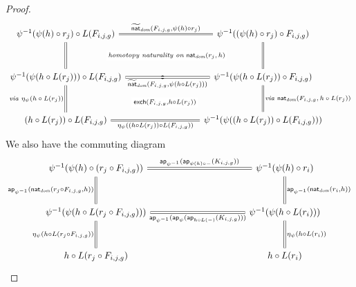 \documentclass[10pt,a4paper]{article}
\theoremstyle{definition}
\theoremstyle{remark}
\newcommand{\dom}{\textit{dom}}
\newcommand{\nat}{\mathsf{nat}}
\newcommand{\0}{\mathbf{0}}
\newcommand{\1}{\mathbf{1}}
\newcommand{\2}{\mathbf{2}}
\DeclareMathOperator{\ap}{\mathsf{ap}}
\begin{document}
\begin{proof}
\[ 
\begin{tikzcd}[column sep = 35, row sep = 30]
	{\psi^{-1}(\psi(h) \circ r_j) \circ L(F_{i,j,g})} && {\psi^{-1}(\mleft(\psi(h) \circ r_j\mright) \circ F_{i,j,g})} \\
	{\psi^{-1}(\psi(h \circ L(r_j))) \circ L(F_{i,j,g})} & \bullet & {\psi^{-1}(\psi(h \circ L(r_j)) \circ F_{i,j,g})} \\
	{\mleft(h \circ L(r_j)\mright) \circ L(F_{i,j,g})} && {\psi^{-1}(\psi(\mleft(h \circ L(r_j)\mright) \circ L(F_{i,j,g})))}
	\arrow[""{name=0, anchor=center, inner sep=0}, "{{\widetilde{\nat}_{\dom}(F_{i,j,g}, \psi(h) \circ r_j)}}", Rightarrow, no head, from=1-1, to=1-3]
	\arrow[Rightarrow, no head, from=1-1, to=2-1]
	\arrow[Rightarrow, no head, from=1-3, to=2-3]
	\arrow[""{name=1, anchor=center, inner sep=0}, "{{\widetilde{\nat}_{\dom}(F_{i,j,g}, \psi(h \circ L(r_j)))}}"', Rightarrow, no head, from=2-1, to=2-3]
	\arrow["{\textit{via $\eta_{\psi}(h \circ L(r_j))$}}"', Rightarrow, no head, from=2-1, to=3-1]
	\arrow["{\textit{via $\nat_{\dom}(F_{i,j,g},h \circ L(r_j))$}}", Rightarrow, no head, from=2-3, to=3-3]
	\arrow[""{name=2, anchor=center, inner sep=0}, "{{\eta_{\psi}( \mleft(h \circ L(r_j)\mright) \circ L(F_{i,j,g}))}}"', Rightarrow, no head, from=3-1, to=3-3]
	\arrow["{{\textit{homotopy naturality on $\nat_{\dom}(r_j,h)$}}}"{description}, draw=none, from=0, to=1]
	\arrow["{{\mathsf{exch}(F_{i,j,g}, h \circ L(r_j))}}"{description}, shift left=3, draw=none, from=2-2, to=2]
\end{tikzcd}\]
We also have the commuting diagram
\[\begin{tikzcd}[column sep = 52, row sep = 30]
	{\psi^{-1}(\psi(h) \circ \mleft(r_j \circ F_{i,j,g}\mright))} && {\psi^{-1}(\psi(h) \circ r_i)} \\
	{\psi^{-1}(\psi(h \circ L(r_j \circ F_{i,j,g})))} && {\psi^{-1}(\psi(h \circ L(r_i)))} \\
	{h \circ L(r_j \circ F_{i,j,g})} && {h \circ L(r_i)}
	\arrow[""{name=0, anchor=center, inner sep=0}, "{\ap_{\psi^{-1}}(\ap_{\psi(h) \circ {-}}(K_{i,j,g}))}", Rightarrow, no head, from=1-1, to=1-3]
	\arrow["{\ap_{\psi^{-1}}(\nat_{\dom}(r_j \circ F_{i,j,g}, h))}"', Rightarrow, no head, from=1-1, to=2-1]
	\arrow["{\ap_{\psi^{-1}}(\nat_{\dom}(r_i, h))}", Rightarrow, no head, from=1-3, to=2-3]
	\arrow[""{name=1, anchor=center, inner sep=0}, "{\ap_{\psi^{-1}}(\ap_{\psi}(\ap_{h \circ L({-})}(K_{i,j,g})))}"', Rightarrow, no head, from=2-1, to=2-3]
	\arrow["{\eta_{\psi}(h \circ L(r_j \circ F_{i,j,g}))}"', Rightarrow, no head, from=2-1, to=3-1]
	\arrow["{\eta_{\psi}(h \circ L(r_i))}", Rightarrow, no head, from=2-3, to=3-3]

\end{tikzcd}\]
\end{proof}
\end{document}
